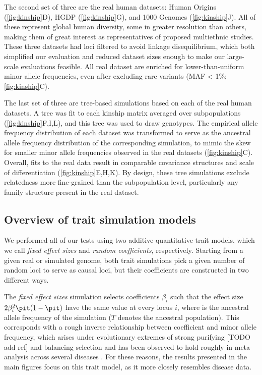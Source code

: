 \documentclass[11pt]{article}
\begin{document}
The second set of three are the real human datasets: Human Origins (\cref{fig:kinship}D), HGDP (\cref{fig:kinship}G), and 1000 Genomes (\cref{fig:kinship}J).
All of these represent global human diversity, some in greater resolution than others, making them of great interest as representatives of proposed multiethnic studies.
These three datasets had loci filtered to avoid linkage disequilibrium, which both simplified our evaluation and reduced dataset sizes enough to make our large-scale evaluations feasible.
All real dataset are enriched for lower-than-uniform minor allele frequencies, even after excluding rare variants (MAF < 1\%; \cref{fig:kinship}C).

The last set of three are tree-based simulations based on each of the real human datasets.
A tree was fit to each kinship matrix averaged over subpopulations (\cref{fig:kinship}F,I,L), and this tree was used to draw genotypes.
The empirical allele frequency distribution of each dataset was transformed to serve as the ancestral allele frequency distribution of the corresponding simulation, to mimic the skew for smaller minor allele frequencies observed in the real datasets (\cref{fig:kinship}C).
Overall, fits to the real data result in comparable covariance structures and scale of differentiation (\cref{fig:kinship}E,H,K).
By design, these tree simulations exclude relatedness more fine-grained than the subpopulation level, particularly any family structure present in the real dataset.

\subsection{Overview of trait simulation models}

We performed all of our tests using two additive quantitative trait models, which we call \textit{fixed effect sizes} and \textit{random coefficients}, respectively.
Starting from a given real or simulated genome, both trait simulations pick a given number of random loci to serve as causal loci, but their coefficients are constructed in two different ways.

The \textit{fixed effect sizes} simulation selects coefficients $\beta_i$ such that the effect size $2 \beta_i^2 \pit ( 1 - \pit )$ have the same value at every locus $i$, where \pit is the ancestral allele frequency of the simulation ($T$ denotes the ancestral population).
This corresponds with a rough inverse relationship between coefficient and minor allele frequency, which arises under evolutionary extremes of strong purifying [TODO add ref] and balancing selection \citep{simons_population_2018} and has been observed to hold roughly in meta-analysis across several diseases \citep{park_distribution_2011}.
For these reasons, the results presented in the main figures focus on this trait model, as it more closely resembles disease data.
\end{document}
